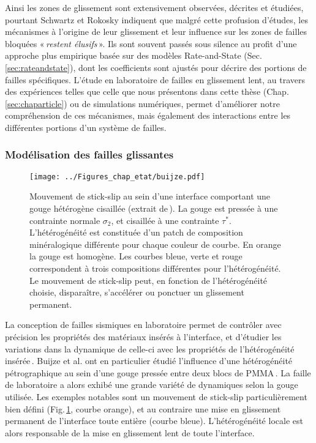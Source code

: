 Ainsi les zones de glissement sont extensivement observées, décrites et étudiées, pourtant Schwartz et Rokosky indiquent que malgré cette profusion d'études, les mécanismes à l'origine de leur glissement et leur influence sur les zones de failles bloquées «\,\textit{restent élusifs}\,». Ils sont souvent passés sous silence au profit d'une approche plus empirique basée sur des modèles Rate-and-State (Sec.\,\ref{sec:rateandstate}), dont les coefficients sont ajustés pour décrire des portions de failles spécifiques. L'étude en laboratoire de failles en glissement lent, au travers des expériences telles que celle que nous présentons dans cette thèse (Chap.\,\ref{sec:chaparticle}) ou de simulations numériques, permet d’améliorer notre compréhension de ces mécanismes, mais également des interactions entre les différentes portions d'un système de failles.



\subsubsection{Modélisation des failles glissantes}

\begin{figure}[htb]
\centering
\texttt{[image: ../Figures\_chap\_etat/buijze.pdf]}
\caption[Effet d'une gouge hétérogène sur le stick-slip]{Mouvement de stick-slip au sein d'une interface comportant une gouge hétérogène cisaillée (extrait de\,\cite{buijze_effects_2021}). La gouge est pressée à une contrainte normale $\sigma_2$, et cisaillée à une contrainte $\tau^*$. L'hétérogénéité est constituée d'un patch de composition minéralogique différente pour chaque couleur de courbe. En orange la gouge est homogène. Les courbes bleue, verte et rouge correspondent à trois compositions différentes pour l'hétérogénéité. Le mouvement de stick-slip peut, en fonction de l'hétérogénéité choisie, disparaître, s'accélérer ou ponctuer un glissement permanent.}
\label{fig:buijze}
\end{figure}



La conception de failles sismiques en laboratoire permet de contrôler avec précision les propriétés des matériaux insérés à l'interface, et d'étudier les variations dans la dynamique de celle-ci avec les propriétés de l'hétérogénéité insérée\,\cite{bedford_fault_2022,buijze_effects_2021,kaproth_slow_2013}. Buijze et al. ont en particulier étudié l'influence d'une hétérogénéité pétrographique au sein d'une gouge pressée entre deux blocs de PMMA\,\cite{buijze_effects_2021}. La faille de laboratoire a alors exhibé une grande variété de dynamiques selon la gouge utilisée. Les exemples notables sont un mouvement de stick-slip particulièrement bien défini (Fig.\,\ref{fig:buijze}, courbe orange), et au contraire une mise en glissement permanent de l'interface toute entière (courbe bleue). L'hétérogénéité locale est alors responsable de la mise en glissement lent de toute l'interface.


